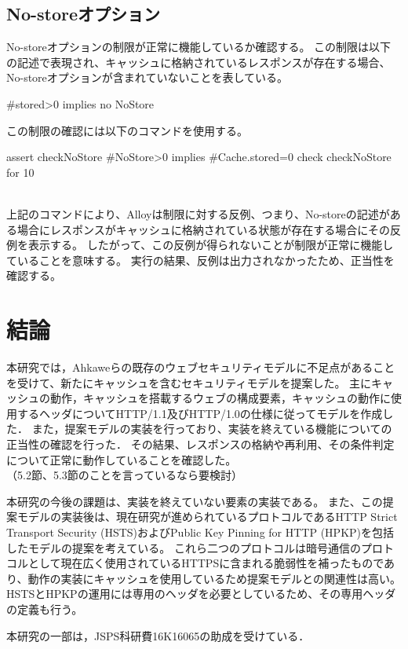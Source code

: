 \documentclass{css}
\begin{document}
\subsection{No-storeオプション}
No-storeオプションの制限が正常に機能しているか確認する。
この制限は以下の記述で表現され、キャッシュに格納されているレスポンスが存在する場合、No-storeオプションが含まれていないことを表している。
\begin{verbatimtab}[2]
	#stored>0 implies no NoStore
\end{verbatimtab}
この制限の確認には以下のコマンドを使用する。\\\hrulefill
\begin{small}
\begin{verbatimtab}[2]
assert checkNoStore{
	#NoStore>0 implies #Cache.stored=0
}
check checkNoStore for 10
\end{verbatimtab}
\end{small}
\hrulefill\\
上記のコマンドにより、Alloyは制限に対する反例、つまり、No-storeの記述がある場合にレスポンスがキャッシュに格納されている状態が存在する場合にその反例を表示する。
したがって、この反例が得られないことが制限が正常に機能していることを意味する。
実行の結果、反例は出力されなかったため、正当性を確認する。
\color{black}

\section{結論}
本研究では，Ahkaweらの既存のウェブセキュリティモデル\cite{webmodel}に不足点があることを受けて、新たにキャッシュを含むセキュリティモデルを提案した。
主にキャッシュの動作，キャッシュを搭載するウェブの構成要素，キャッシュの動作に使用するヘッダについてHTTP/1.1及びHTTP/1.0の仕様に従ってモデルを作成した．
また，提案モデルの実装を行っており、実装を終えている機能についての正当性の確認を行った．
その結果、レスポンスの格納や再利用、その条件判定について正常に動作していることを確認した。
\\\color{red}
（5.2節、5.3節のことを言っているなら要検討）
\color{black}

本研究の今後の課題は、実装を終えていない要素の実装である。
また、この提案モデルの実装後は、現在研究が進められているプロトコルであるHTTP Strict Transport Security (HSTS)\cite{rfc6797}およびPublic Key Pinning for HTTP (HPKP)\cite{rfc7469}を包括したモデルの提案を考えている。
これら二つのプロトコルは暗号通信のプロトコルとして現在広く使用されているHTTPSに含まれる脆弱性を補ったものであり、動作の実装にキャッシュを使用しているため提案モデルとの関連性は高い。
HSTSとHPKPの運用には専用のヘッダを必要としているため、その専用ヘッダの定義も行う。

\begin{acknowledgment}
本研究の一部は，JSPS科研費16K16065の助成を受けている．
\end{acknowledgment}



\end{document}
